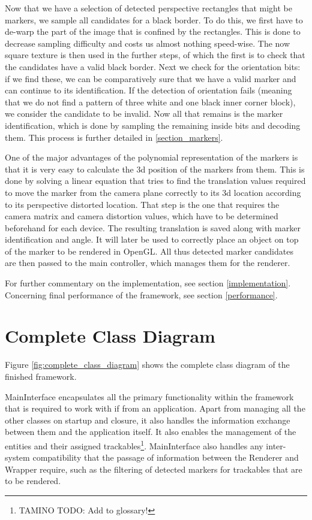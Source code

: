 Now that we have a selection of detected perspective rectangles that might be markers, we sample all candidates for a black border.
To do this, we first have to de-warp the part of the image that is confined by the rectangles.
This is done to decrease sampling difficulty and costs us almost nothing speed-wise.
The now square texture is then used in the further steps, of which the first is to check that the candidates have a valid black border.
Next we check for the orientation bits: if we find these, we can be comparatively sure that we have a valid marker and can continue to its identification.
If the detection of orientation fails (meaning that we do not find a pattern of three white and one black inner corner block), we consider the candidate to be invalid.
Now all that remains is the marker identification, which is done by sampling the remaining inside bits and decoding them.
This process is further detailed in \ref{section_markers}.

One of the major advantages of the polynomial representation of the markers is that it is very easy to calculate the 3d position of the markers from them.
This is done by solving a linear equation that tries to find the translation values required to move the marker from the camera plane correctly to its 3d location according to its perspective distorted location.
That step is the one that requires the camera matrix and camera distortion values, which have to be determined beforehand for each device.
The resulting translation is saved along with marker identification and angle.
It will later be used to correctly place an object on top of the marker to be rendered in OpenGL.
All thus detected marker candidates are then passed to the main controller, which manages them for the renderer.

For further commentary on the implementation, see section \ref{implementation}.
Concerning final performance of the framework, see section \ref{performance}.

\section{Complete Class Diagram}
\label{complete_class}

Figure \ref{fig:complete_class_diagram} shows the complete class diagram of the finished framework.

MainInterface encapsulates all the primary functionality within the framework that is required to work with if from an application.
Apart from managing all the other classes on startup and closure, it also handles the information exchange between them and the application itself.
It also enables the management of the entities and their assigned trackables\footnote{TAMINO TODO: Add to glossary!}.
MainInterface also handles any inter-system compatibility that the passage of information between the Renderer and Wrapper require, such as the filtering of detected markers for trackables that are to be rendered.

